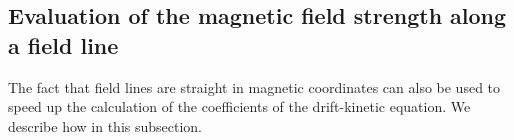 \subsection{Evaluation of the magnetic field strength along a field line}\label{SEC_DELTA}


The fact that field lines are straight in magnetic coordinates can also be used to speed up the calculation of the coefficients of the drift-kinetic equation. We describe how in this subsection. 

